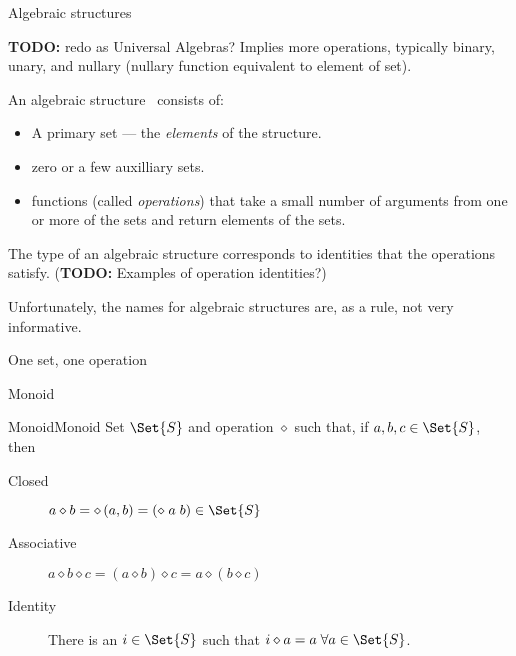 \begin{plSection}{Algebraic structures}
\label{sec:Algebraic-structures}

\textbf{TODO:} redo as Universal Algebras?
Implies more operations, typically binary, unary, and nullary
(nullary function equivalent to element of set).

An algebraic 
structure~\cite{
wiki:AlgebraicStructure,
wiki:MathematicalStructure,
wiki:OutlineOfAlgebraicStructures,
BWilliams:AlgebraicAtructureAndProtocols,
BWilliams:AlgebraOfPredicatesAndSortingFunctions,
BWilliams:SemiringsAndPredicates}
consists of:
\begin{itemize}
  \item A primary set --- the \textit{elements} of the structure.
  \item zero or a few auxilliary sets.
  \item functions (called \textit{operations})
that take a small number of arguments from one or more of the sets
and return elements of the sets.
\end{itemize}

The type of an algebraic structure corresponds to identities
that the operations satisfy.
(\textbf{TODO:} Examples of operation identities?)

Unfortunately, the names for algebraic structures 
are, as a rule, not very informative.

\begin{plSection}{One set, one operation}
\begin{plSection}{Monoid}
\label{sec:Monoid}

\begin{plDefinition}{Monoid}{Monoid}
Set $\Set{S}$ and operation $\diamond$ such that,
if $a, b, c \in \Set{S}$, then
\begin{description}
\item[Closed] $a \diamond b = \diamond \left( a, b \right) 
= \left( \diamond \; a \; b \right) \in \Set{S}$
\item[Associative] $a \diamond b \diamond c =
 \left( a \diamond b \right) \diamond c =  
 a \diamond \left( b \diamond c \right) $
\item[Identity] There is an $i \in \Set{S}$ such that 
 $i \diamond a = a \; \forall a \in \Set{S}$.
\end{description}
\end{plDefinition}%


\end{plSection}
\end{plSection}
\end{plSection}
